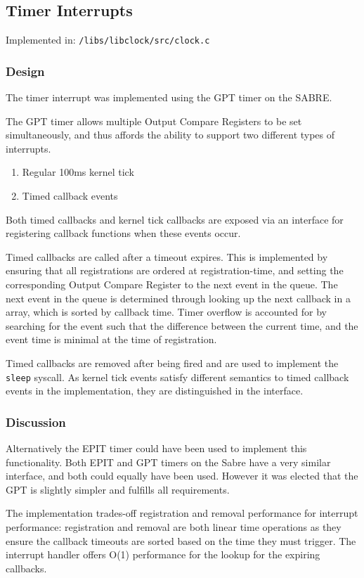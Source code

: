 \documentclass[a4paper,12pt]{article}
\begin{document}
\subsection{Timer Interrupts}
Implemented in: \texttt{/libs/libclock/src/clock.c}

\subsubsection{Design}
The timer interrupt was implemented using the GPT timer on the SABRE.

The GPT timer allows multiple Output Compare Registers to be set
simultaneously, and thus affords the ability to support two different types of
interrupts.

\begin{enumerate}
\item Regular 100ms kernel tick
\item Timed callback events
\end{enumerate}

Both timed callbacks and kernel tick callbacks are exposed via an interface
for registering callback functions when these events occur.

Timed callbacks are called after a timeout expires.  This is implemented by
ensuring that all registrations are ordered at registration-time, and setting
the corresponding Output Compare Register to the next event in the queue.  The
next event in the queue is determined through looking up the next callback in
a array, which is sorted by callback time.  Timer overflow is accounted for by
searching for the event such that the difference between the current time, and
the event time is minimal at the time of registration.

Timed callbacks are removed after being fired and are used to implement the
\texttt{sleep} syscall.  As kernel tick events satisfy different semantics to
timed callback events in the implementation, they are distinguished in the
interface.

\subsubsection{Discussion}
Alternatively the EPIT timer could have been used to implement this
functionality.  Both EPIT and GPT timers on the Sabre have a very similar
interface, and both could equally have been used.  However it was elected that
the GPT is slightly simpler and fulfills all requirements.

The implementation trades-off registration and removal performance for
interrupt performance: registration and removal are both linear time
operations as they ensure the callback timeouts are sorted based on the time
they must trigger.  The interrupt handler offers O(1) performance for
the lookup for the expiring callbacks.
\end{document}
